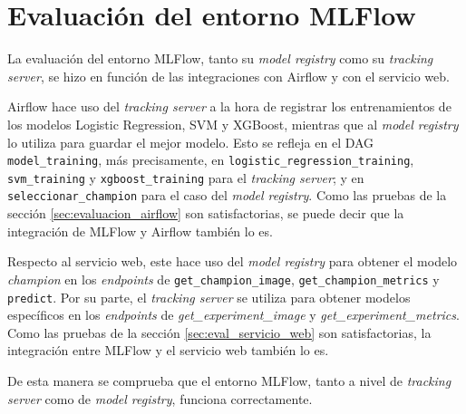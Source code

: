 \section{Evaluación del entorno MLFlow}

La evaluación del entorno MLFlow, tanto su \textit{model registry} como su \textit{tracking server}, se hizo en función de las integraciones con Airflow y con el servicio web.

Airflow hace uso del \textit{tracking server} a la hora de registrar los entrenamientos de los modelos Logistic Regression, SVM y XGBoost, mientras que al \textit{model registry} lo utiliza para guardar el mejor modelo. Esto se refleja en el DAG \texttt{model\_training}, más precisamente, en \texttt{logistic\_regression\_training}, \texttt{svm\_training} y \texttt{xgboost\_training} para el \textit{tracking server}; y en \texttt{seleccionar\_champion} para el caso del \textit{model registry}. Como las pruebas de la sección \ref{sec:evaluacion_airflow} son satisfactorias, se puede decir que la integración de MLFlow y Airflow también lo es.

Respecto al servicio web, este hace uso del \textit{model registry} para obtener el modelo \textit{champion} en los \textit{endpoints} de \texttt{get\_champion\_image}, \texttt{get\_champion\_metrics} y \texttt{predict}. Por su parte, el \textit{tracking server} se utiliza para obtener modelos específicos en los \textit{endpoints} de \textit{get\_experiment\_image} y \textit{get\_experiment\_metrics}. Como las pruebas de la sección \ref{sec:eval_servicio_web} son satisfactorias, la integración entre MLFlow y el servicio web también lo es.

De esta manera se comprueba que el entorno MLFlow, tanto a nivel de \textit{tracking server} como de \textit{model registry}, funciona correctamente.



